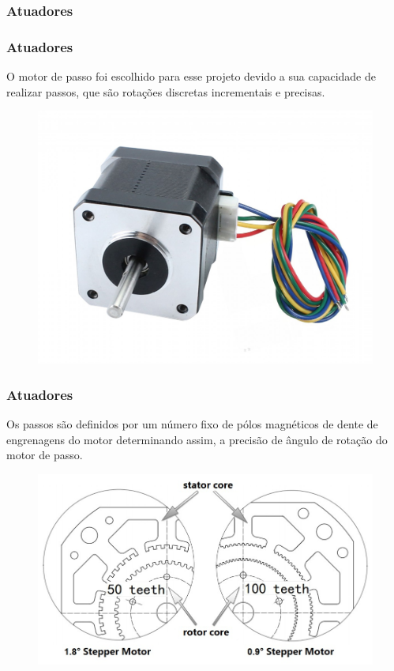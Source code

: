 \subsubsection{Atuadores}

\begin{frame}
\frametitle{Atuadores}

O motor de passo foi escolhido para esse projeto devido a sua capacidade de realizar passos, que são rotações discretas incrementais e precisas. 

\begin{figure}
\centering
\includegraphics[scale = 0.1]{figs/motordepassoex}
\end{figure}

\end{frame}

\begin{frame}
\frametitle{Atuadores}

Os passos são definidos por um número fixo de pólos magnéticos de dente de engrenagens do motor determinando assim, a precisão de ângulo de rotação do motor de passo.

\begin{figure}
\centering
\includegraphics[scale = 0.3]{figs/didaticopasso}
\end{figure}

\end{frame}

